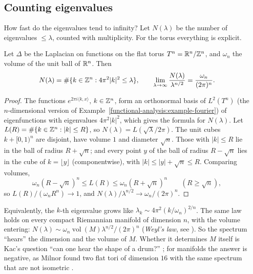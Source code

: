 \subsection{Counting eigenvalues}\label{elliptic-operators:subsection-weyl}

How fast do the eigenvalues tend to infinity? Let $N(\lambda)$ be the number of eigenvalues $\leq \lambda$, counted with multiplicity. For the torus everything is explicit.

\begin{proposition}\label{elliptic-operators:proposition-weyl-torus}
Let $\Delta$ be the Laplacian on functions on the flat torus $T^n = \mathbb{R}^n/\mathbb{Z}^n$, and $\omega_n$ the volume of the unit ball of $\mathbb{R}^n$. Then
\[
N(\lambda) = \#\{k \in \mathbb{Z}^n : 4\pi^2|k|^2 \leq \lambda\}, \qquad \lim_{\lambda \to \infty}\frac{N(\lambda)}{\lambda^{n/2}} = \frac{\omega_n}{(2\pi)^n}.
\]
\end{proposition}

\begin{proof}
The functions $e^{2\pi i\langle k, x\rangle}$, $k \in \mathbb{Z}^n$, form an orthonormal basis of $L^2(T^n)$ (the $n$-dimensional version of Example~\ref{functional-analysis:example-fourier}) of eigenfunctions with eigenvalues
$4\pi^2|k|^2$, which gives the formula for $N(\lambda)$. Let $L(R) = \#\{k \in \mathbb{Z}^n : |k| \leq R\}$, so $N(\lambda) = L(\sqrt\lambda/2\pi)$. The unit cubes $k + [0, 1)^n$ are disjoint, have volume $1$ and diameter $\sqrt n$. Those with
$|k| \leq R$ lie in the ball of radius $R + \sqrt n$; and every point $y$ of the ball of radius $R - \sqrt n$ lies in the cube of $k = \lfloor y\rfloor$ (componentwise), with $|k| \leq |y| + \sqrt n \leq R$. Comparing volumes,
\[
\omega_n(R - \sqrt n)^n \leq L(R) \leq \omega_n(R + \sqrt n)^n \qquad (R \geq \sqrt n),
\]
so $L(R)/(\omega_nR^n) \to 1$, and $N(\lambda)/\lambda^{n/2} \to \omega_n/(2\pi)^n$.
\end{proof}

Equivalently, the $k$-th eigenvalue grows like $\lambda_k \sim 4\pi^2(k/\omega_n)^{2/n}$. The same law holds on every compact Riemannian manifold of dimension $n$, with the volume entering:
$N(\lambda) \sim \omega_n\operatorname{vol}(M)\lambda^{n/2}/(2\pi)^n$ (\emph{Weyl's law}, see \cite{kac-1966}). So the spectrum ``hears'' the dimension and the volume of $M$. Whether it determines $M$ itself is Kac's
question ``can one hear the shape of a drum?'' \cite{kac-1966}; for manifolds the answer is negative, as Milnor found two flat tori of dimension $16$ with the same spectrum that are not isometric
\cite{milnor-1964}.

